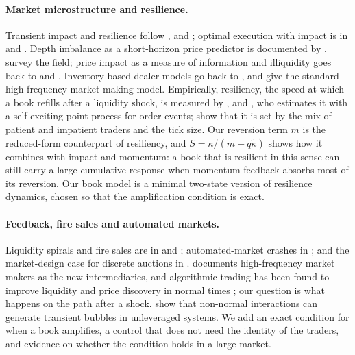 \documentclass[12pt]{article}
\theoremstyle{definition}
\theoremstyle{remark}
\begin{document}
\paragraph{Market microstructure and resilience.} Transient impact and resilience follow \citet{obizhaeva2013}, \citet{bouchaud2004} and \citet{bouchaud2018}; optimal execution with impact is in \citet{almgren2001} and \citet{cartea2015}. Depth imbalance as a short-horizon price predictor is documented by \citet{cont2014}. \citet{biais2005} survey the field; price impact as a measure of information and illiquidity goes back to \citet{kyle1985} and \citet{amihud2002}. Inventory-based dealer models go back to \citet{ho1981}, and \citet{avellaneda2008} give the standard high-frequency market-making model. Empirically, resiliency, the speed at which a book refills after a liquidity shock, is measured by \citet{biais1995}, \citet{degryse2005} and \citet{large2007}, who estimates it with a self-exciting point process for order events; \citet{foucault2005} show that it is set by the mix of patient and impatient traders and the tick size. Our reversion term $m$ is the reduced-form counterpart of resiliency, and $S=\tilde\kappa/(m-q\tilde\kappa)$ shows how it combines with impact and momentum: a book that is resilient in this sense can still carry a large cumulative response when momentum feedback absorbs most of its reversion. Our book model is a minimal two-state version of resilience dynamics, chosen so that the amplification condition is exact.

\paragraph{Feedback, fire sales and automated markets.} Liquidity spirals and fire sales are in \citet{shleifer1992} and \citet{brunnermeier2009}; automated-market crashes in \citet{kirilenko2017}; and the market-design case for discrete auctions in \citet{budish2015}. \citet{menkveld2013} documents high-frequency market makers as the new intermediaries, and algorithmic trading has been found to improve liquidity and price discovery in normal times \citep{hendershott2011,brogaard2014}; our question is what happens on the path after a shock. \citet{sornette2023} show that non-normal interactions can generate transient bubbles in unleveraged systems. We add an exact condition for when a book amplifies, a control that does not need the identity of the traders, and evidence on whether the condition holds in a large market.
\end{document}
